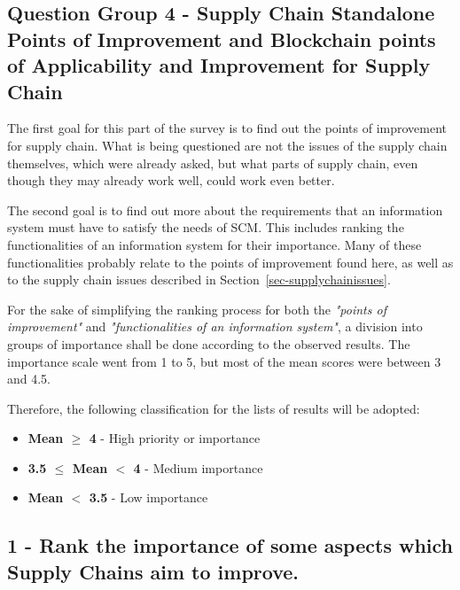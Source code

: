 
\subsection{Question Group 4 - Supply Chain Standalone Points of Improvement and Blockchain points of Applicability and Improvement for Supply Chain}
\label{sec-survey-improvement-functionalities}

The first goal for this part of the survey is to find out the points of improvement for supply chain. What is being questioned are not the issues of the supply chain themselves, which were already asked, but what parts of supply chain, even though they may already work well, could work even better.

The second goal is to find out more about the requirements that an information system must have to satisfy the needs of SCM. This includes ranking the functionalities of an information system for their importance. Many of these functionalities probably relate to the points of improvement found here, as well as to the supply chain issues described in Section~\ref{sec-supplychainissues}.




For the sake of simplifying the ranking process for both the \textit{"points of improvement"} and \textit{"functionalities of an information system"}, a division into groups of importance shall be done according to the observed results. The importance scale went from 1 to 5, but most of the mean scores were between 3 and 4.5. 

Therefore, the following classification for the lists of results will be adopted: 

\begin{itemize}
    \item \textbf{Mean 	$\geq$ 4} - High priority or importance
    \item \textbf{3.5 $\leq$ Mean $<$ 4} - Medium importance 
    \item \textbf{Mean $<$ 3.5} - Low importance
\end{itemize}

\subsection*{1 - Rank the importance of some aspects which Supply Chains aim to improve.}
 
